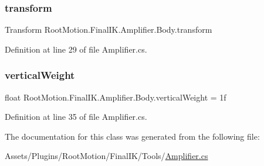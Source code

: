 \subsubsection{\texorpdfstring{transform}{transform}}
{\footnotesize\ttfamily Transform Root\+Motion.\+Final\+I\+K.\+Amplifier.\+Body.\+transform}



Definition at line 29 of file Amplifier.\+cs.

\mbox{\label{class_root_motion_1_1_final_i_k_1_1_amplifier_1_1_body_a19f95f2c05f02fcae8ed9f8c40d78381}} 
\subsubsection{\texorpdfstring{vertical\+Weight}{verticalWeight}}
{\footnotesize\ttfamily float Root\+Motion.\+Final\+I\+K.\+Amplifier.\+Body.\+vertical\+Weight = 1f}



Definition at line 35 of file Amplifier.\+cs.



The documentation for this class was generated from the following file\+:\begin{DoxyCompactItemize}
\item 
Assets/\+Plugins/\+Root\+Motion/\+Final\+I\+K/\+Tools/\mbox{\hyperlink{_amplifier_8cs}{Amplifier.\+cs}}\end{DoxyCompactItemize}
